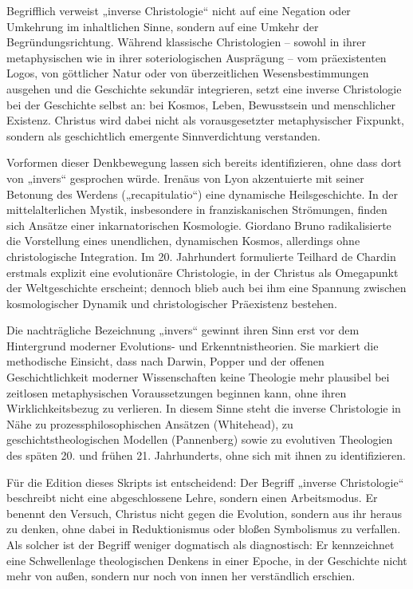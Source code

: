 \documentclass[
  ngerman,
]{article}
\begin{document}
Begrifflich verweist „inverse Christologie`` nicht auf eine Negation
oder Umkehrung im inhaltlichen Sinne, sondern auf eine Umkehr der
Begründungsrichtung. Während klassische Christologien -- sowohl in ihrer
metaphysischen wie in ihrer soteriologischen Ausprägung -- vom
präexistenten Logos, von göttlicher Natur oder von überzeitlichen
Wesensbestimmungen ausgehen und die Geschichte sekundär integrieren,
setzt eine inverse Christologie bei der Geschichte selbst an: bei
Kosmos, Leben, Bewusstsein und menschlicher Existenz. Christus wird
dabei nicht als vorausgesetzter metaphysischer Fixpunkt, sondern als
geschichtlich emergente Sinnverdichtung verstanden.

Vorformen dieser Denkbewegung lassen sich bereits identifizieren, ohne
dass dort von „invers`` gesprochen würde. Irenäus von Lyon akzentuierte
mit seiner Betonung des Werdens („recapitulatio``) eine dynamische
Heilsgeschichte. In der mittelalterlichen Mystik, insbesondere in
franziskanischen Strömungen, finden sich Ansätze einer inkarnatorischen
Kosmologie. Giordano Bruno radikalisierte die Vorstellung eines
unendlichen, dynamischen Kosmos, allerdings ohne christologische
Integration. Im 20. Jahrhundert formulierte Teilhard de Chardin erstmals
explizit eine evolutionäre Christologie, in der Christus als Omegapunkt
der Weltgeschichte erscheint; dennoch blieb auch bei ihm eine Spannung
zwischen kosmologischer Dynamik und christologischer Präexistenz
bestehen.

Die nachträgliche Bezeichnung „invers`` gewinnt ihren Sinn erst vor dem
Hintergrund moderner Evolutions- und Erkenntnistheorien. Sie markiert
die methodische Einsicht, dass nach Darwin, Popper und der offenen
Geschichtlichkeit moderner Wissenschaften keine Theologie mehr plausibel
bei zeitlosen metaphysischen Voraussetzungen beginnen kann, ohne ihren
Wirklichkeitsbezug zu verlieren. In diesem Sinne steht die inverse
Christologie in Nähe zu prozessphilosophischen Ansätzen (Whitehead), zu
geschichtstheologischen Modellen (Pannenberg) sowie zu evolutiven
Theologien des späten 20. und frühen 21. Jahrhunderts, ohne sich mit
ihnen zu identifizieren.

Für die Edition dieses Skripts ist entscheidend: Der Begriff „inverse
Christologie`` beschreibt nicht eine abgeschlossene Lehre, sondern einen
Arbeitsmodus. Er benennt den Versuch, Christus nicht gegen die
Evolution, sondern aus ihr heraus zu denken, ohne dabei in
Reduktionismus oder bloßen Symbolismus zu verfallen. Als solcher ist der
Begriff weniger dogmatisch als diagnostisch: Er kennzeichnet eine
Schwellenlage theologischen Denkens in einer Epoche, in der Geschichte
nicht mehr von außen, sondern nur noch von innen her verständlich
erschien.
\end{document}
